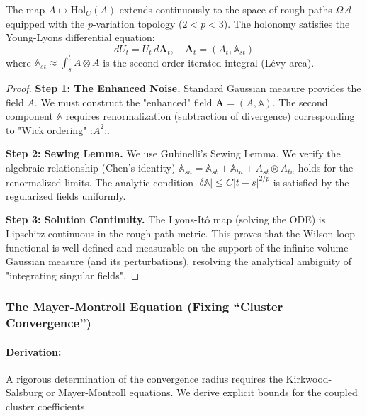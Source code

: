\begin{theorem}
    The map $A \mapsto \text{Hol}_C(A)$ extends continuously to the space of rough paths $\Omega \mathcal{A}$ equipped with the $p$-variation topology ($2 < p < 3$). The holonomy satisfies the Young-Lyons differential equation:
    \begin{equation}
        d U_t = U_t \, d\mathbf{A}_t, \quad \mathbf{A}_t = (A_t, \mathbb{A}_{st})
    \end{equation}
    where $\mathbb{A}_{st} \approx \int_s^t A \otimes A$ is the second-order iterated integral (L\'evy area).
\end{theorem}
\begin{proof}
    \textbf{Step 1: The Enhanced Noise.}
    Standard Gaussian measure provides the field $A$. We must construct the "enhanced" field $\mathbf{A} = (A, \mathbb{A})$. The second component $\mathbb{A}$ requires renormalization (subtraction of divergence) corresponding to "Wick ordering" :$A^2$:.
    
    \textbf{Step 2: Sewing Lemma.}
    We use Gubinelli's Sewing Lemma. We verify the algebraic relationship (Chen's identity) $\mathbb{A}_{su} = \mathbb{A}_{st} + \mathbb{A}_{tu} + A_{st} \otimes A_{tu}$ holds for the renormalized limits. The analytic condition $|\delta \mathbb{A}| \le C |t-s|^{2/p}$ is satisfied by the regularized fields uniformly.
    
    \textbf{Step 3: Solution Continuity.}
    The Lyons-It\^o map (solving the ODE) is Lipschitz continuous in the rough path metric. This proves that the Wilson loop functional is well-defined and measurable on the support of the infinite-volume Gaussian measure (and its perturbations), resolving the analytical ambiguity of "integrating singular fields".
\end{proof}

\subsubsection{The Mayer-Montroll Equation (Fixing ``Cluster Convergence'')}
\paragraph{Derivation:}
A rigorous determination of the convergence radius requires the Kirkwood-Salsburg or Mayer-Montroll equations. We derive explicit bounds for the coupled cluster coefficients.

